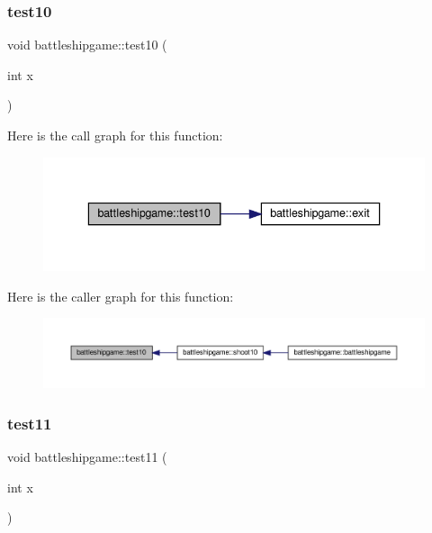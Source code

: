 \subsubsection{\texorpdfstring{test10}{test10}}
{\footnotesize\ttfamily void battleshipgame\+::test10 (\begin{DoxyParamCaption}\item[{int}]{x }\end{DoxyParamCaption})\hspace{0.3cm}{\ttfamily [slot]}}

Here is the call graph for this function\+:
\nopagebreak
\begin{figure}[H]
\begin{center}
\leavevmode
\includegraphics[width=336pt]{classbattleshipgame_a894f81d8d9368923b8b6c49f373a916d_cgraph}
\end{center}
\end{figure}
Here is the caller graph for this function\+:
\nopagebreak
\begin{figure}[H]
\begin{center}
\leavevmode
\includegraphics[width=350pt]{classbattleshipgame_a894f81d8d9368923b8b6c49f373a916d_icgraph}
\end{center}
\end{figure}
\mbox{\label{classbattleshipgame_ac984d3cc5f2c495315f0e40b3386a170}} 
\subsubsection{\texorpdfstring{test11}{test11}}
{\footnotesize\ttfamily void battleshipgame\+::test11 (\begin{DoxyParamCaption}\item[{int}]{x }\end{DoxyParamCaption})\hspace{0.3cm}{\ttfamily [slot]}}

